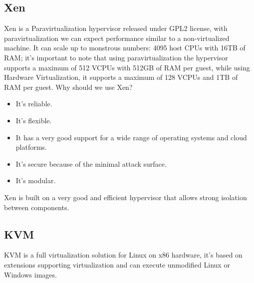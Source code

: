 \subsection{Xen}
Xen is a Paravirtualization hypervisor released under GPL2 license, with paravirtualization we can expect performance similar to a non-virtualized machine. It can scale up to monstrous numbers: 4095 host CPUs with 16TB of RAM; it's important to note that using paravirtualization the hypervisor supports a maximum of 512 VCPUs with 512GB of RAM per guest, while using Hardware Virtualization, it supports a maximum of 128 VCPUs and 1TB of RAM per guest. \n
Why should we use Xen?
\begin{itemize}
    \item It's reliable.
    \item It's flexible.
    \item It has a very good support for a wide range of operating systems and cloud platforms.
    \item It's secure because of the minimal attack surface.
    \item It's modular.
\end{itemize}
Xen is built on a very good and efficient hypervisor that allows strong isolation between components.
\subsection{KVM}
KVM is a full virtualization solution for Linux on x86 hardware, it's based on extensions supporting virtualization and can execute unmodified Linux or Windows images.
